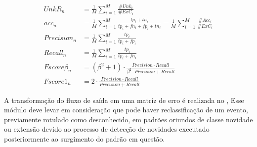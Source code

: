 \begin{align}
  \mathit{UnkR}_n       &= \frac{1}{M} \sum_{i=1}^{M} \frac{\#Unk_i}{\#ExC_i} \label{eq:unkr} \\
  \mathit{acc}_n        &= \frac{1}{M} \sum_{i=1}^{M} \frac{tp_i + tn_i}{tp_i+fn_i+fp_i+tn_i}
  = \frac{1}{M} \sum_{i=1}^{M} \frac{\#Acc_i}{\#ExC_i}  \label{eq:acc} \\
  \mathit{Precision}_n  &= \frac{1}{M} \sum_{i=1}^{M} \frac{tp_i}{tp_i+fp_i} \\
  \mathit{Recall}_n     &= \frac{1}{M} \sum_{i=1}^{M} \frac{tp_i}{tp_i+fn_i} \\
  \mathit{Fscore}\beta_n &= (\beta^2 +1) \cdot
  \frac{
  \mathit{Precision} \cdot \mathit{Recall}
  }{
    \beta^2 \cdot \mathit{Precision} +\mathit{Recall}
  }\\
  \mathit{Fscore}1_n   &= 2 \cdot \frac{
    \mathit{Precision} \cdot \mathit{Recall}
    }{
      \mathit{Precision} +\mathit{Recall}
    } \label{eq:fscore}
\end{align}


A transformação do fluxo de saída em uma matriz de erro é realizada no \sink,
Esse módulo deve levar em consideração que pode haver reclassificação de um
evento, previamente rotulado como desconhecido, em padrões oriundos de classe
novidade ou extensão devido ao processo de detecção de novidades executado
posteriormente ao surgimento do padrão em questão.



